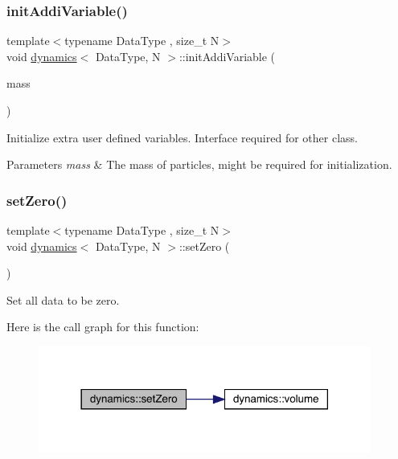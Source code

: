 \subsubsection{\texorpdfstring{init\+Addi\+Variable()}{initAddiVariable()}}
{\footnotesize\ttfamily template$<$typename Data\+Type , size\+\_\+t N$>$ \\
void \mbox{\hyperlink{classdynamics}{dynamics}}$<$ Data\+Type, N $>$\+::init\+Addi\+Variable (\begin{DoxyParamCaption}\item[{\mbox{\hyperlink{classdynamics_ac31f831ea1577092662dafd2daba0f48}{Scalar\+Array}} \&}]{mass }\end{DoxyParamCaption})\hspace{0.3cm}{\ttfamily [inline]}}



Initialize extra user defined variables. Interface required for other class. 


\begin{DoxyParams}{Parameters}
{\em mass} & The mass of particles, might be required for initialization. \\
\hline
\end{DoxyParams}
\mbox{\label{classdynamics_a4dc0dd48fd48ef5cfc0128faaeb22b32}} 
\subsubsection{\texorpdfstring{set\+Zero()}{setZero()}}
{\footnotesize\ttfamily template$<$typename Data\+Type , size\+\_\+t N$>$ \\
void \mbox{\hyperlink{classdynamics}{dynamics}}$<$ Data\+Type, N $>$\+::set\+Zero (\begin{DoxyParamCaption}{ }\end{DoxyParamCaption})\hspace{0.3cm}{\ttfamily [inline]}}



Set all data to be zero. 

Here is the call graph for this function\+:\nopagebreak
\begin{figure}[H]
\begin{center}
\leavevmode
\includegraphics[width=310pt]{classdynamics_a4dc0dd48fd48ef5cfc0128faaeb22b32_cgraph}
\end{center}
\end{figure}
\mbox{\label{classdynamics_a414656e44a6981327ae59af4deea9b8c}} 
